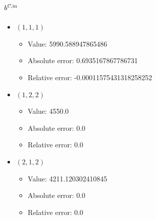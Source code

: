 \documentclass{article}%
\begin{document}
\subsection{$b^{\textsl{C},\text{in}}$}%
\begin{itemize}%
	\item $(1, 1, 1)$%
	\begin{itemize}%
		\item Value: 5990.588947865486%
		\item Absolute error: 0.6935167867786731%
		\item Relative error: -0.00011575431318258252%
	\end{itemize}%
	\item $(1, 2, 2)$%
	\begin{itemize}%
		\item Value: 4550.0%
		\item Absolute error: 0.0%
		\item Relative error: 0.0%
	\end{itemize}%
	\item $(2, 1, 2)$%
	\begin{itemize}%
		\item Value: 4211.120302410845%
		\item Absolute error: 0.0%
		\item Relative error: 0.0%
	\end{itemize}%
\end{itemize}%
\end{document}
